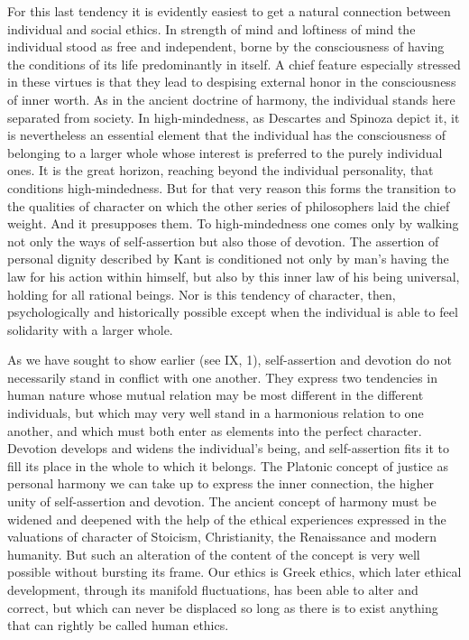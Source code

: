 \documentclass[12pt,a4paper,openany]{book}
\newcommand{\opage}[1]{\marginnote{\footnotesize\textit{[#1]}}}
\begin{document}
For this last tendency it is evidently easiest to get a natural connection between individual and social ethics.
In strength of mind and loftiness of mind the individual stood as free and independent, borne by the
consciousness of having the conditions of its life predominantly in itself. A chief feature especially stressed
in these virtues is that they lead to despising external honor in the consciousness of inner worth. As in the
ancient doctrine of harmony, the individual stands here separated from society. In high-mindedness, as Descartes
and Spinoza depict it, it is nevertheless an essential element that the individual has the consciousness of
belonging to a larger whole whose interest is preferred to the purely individual ones. It is the great horizon,
reaching beyond the individual personality, that conditions high-mindedness. But for that very reason this forms
the transition to the qualities of character on which the other series of philosophers laid the chief weight. And
it presupposes them. To high-mindedness one comes only by walking not only the ways of self-assertion but also
those of devotion. The assertion of personal dignity described by Kant is conditioned not only by man's having
the law for his action within himself, but also by this inner law of his being universal, holding for all
rational beings. Nor is this tendency of character, then, psychologically and historically possible except when
the individual is able to feel solidarity with a larger whole.

As we have sought to show earlier (see IX, 1), self-assertion and devotion do not necessarily stand in conflict
with one another. They express two tendencies in human nature whose mutual relation may be most different in the
different
\opage{206}individuals, but which may very well stand in a harmonious relation to one another, and which must both
enter as elements into the perfect character. Devotion develops and widens the individual's being, and
self-assertion fits it to fill its place in the whole to which it belongs. The Platonic concept of justice as
personal harmony we can take up to express the inner connection, the higher unity of self-assertion and devotion.
The ancient concept of harmony must be widened and deepened with the help of the ethical experiences expressed in
the valuations of character of Stoicism, Christianity, the Renaissance and modern humanity. But such an alteration
of the content of the concept is very well possible without bursting its frame. Our ethics is Greek ethics, which
later ethical development, through its manifold fluctuations, has been able to alter and correct, but which can
never be displaced so long as there is to exist anything that can rightly be called human ethics.
\end{document}

